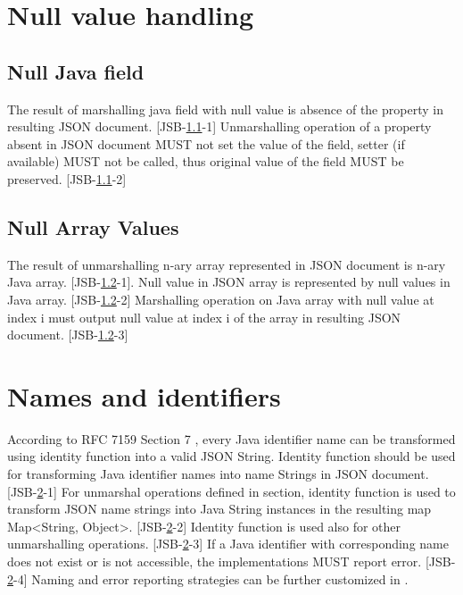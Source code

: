 \section{Null value handling}
\label{sec:null}

\subsection{Null Java field}
\label{subsec:nullfield}
The result of marshalling java field with null value is absence of the property in resulting JSON document. [JSB-\ref{subsec:nullfield}-1]
Unmarshalling operation of a property absent in JSON document MUST not set the value of the field, setter (if available) MUST not be called, thus original value of the field MUST be preserved. [JSB-\ref{subsec:nullfield}-2]

\subsection{Null Array Values}
\label{subsec:nullarray}
The result of unmarshalling n-ary array represented in JSON document is n-ary Java array. [JSB-\ref{subsec:nullarray}-1]. Null value in JSON array is represented by null values in Java array. [JSB-\ref{subsec:nullarray}-2]
Marshalling operation on Java array with null value at index i must output null value at index i of the array in resulting JSON document. [JSB-\ref{subsec:nullarray}-3]

\section{Names and identifiers}
\label{sec:naming}
According to RFC 7159 Section 7 \cite{rfc7159}, every Java identifier name can be transformed using identity function into a valid JSON String. Identity function should be used for transforming Java identifier names into name Strings in JSON document. [JSB-\ref{sec:naming}-1]
For unmarshal operations defined in  section, identity function is used to transform JSON name strings into Java String instances in the resulting map Map\textless String, Object\textgreater. [JSB-\ref{sec:naming}-2] Identity function is used also for other unmarshalling operations. [JSB-\ref{sec:naming}-3] If a Java identifier with corresponding name does not exist or is not accessible, the implementations MUST report error. [JSB-\ref{sec:naming}-4] Naming and error reporting strategies can be further customized in .

